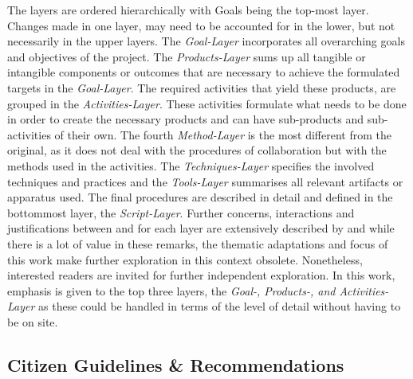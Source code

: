 The layers are ordered hierarchically with Goals being the top-most layer. Changes made in one layer, may need to be accounted for in the lower, but not necessarily in the upper layers. The \textit{Goal-Layer} incorporates all overarching goals and objectives of the project. The \textit{Products-Layer} sums up all tangible or intangible components or outcomes that are necessary to achieve the formulated targets in the \textit{Goal-Layer}. The required activities that yield these products, are grouped in the \textit{Activities-Layer}. These activities formulate what needs to be done in order to create the necessary products and can have sub-products and sub-activities of their own. The fourth \textit{Method-Layer} is the most different from the original, as it does not deal with the procedures of collaboration but with the methods used in the activities. The \textit{Techniques-Layer} specifies the involved techniques and practices and the \textit{Tools-Layer} summarises all relevant artifacts or apparatus used. The final procedures are described in detail and defined in the bottommost layer, the \textit{Script-Layer}. Further concerns, interactions and justifications between and for each layer are extensively described by \textcite{briggsSevenLayerModelCollaboration2009} and while there is a lot of value in these remarks, the thematic adaptations and focus of this work make further exploration in this context obsolete. Nonetheless, interested readers are invited for further independent exploration. In this work, emphasis is given to the top three layers, the \textit{Goal-, Products-, and Activities-Layer} as these could be handled in terms of the level of detail without having to be on site.

\subsection{Citizen Guidelines \& Recommendations}

